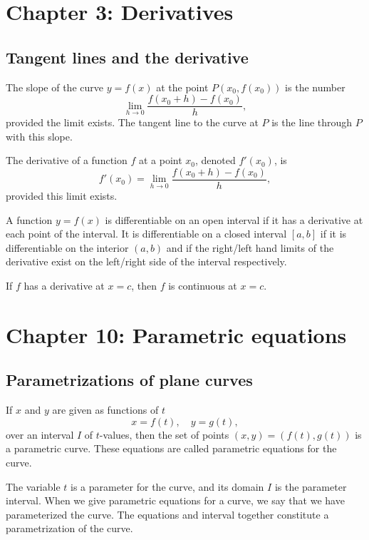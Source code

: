 \documentclass[oneside]{book}
\begin{document}
\section{Chapter 3: Derivatives}
\subsection{Tangent lines and the derivative}
\begin{definition}
	The slope of the curve \(y=f(x)\) at the point \(P(x_0,f(x_0))\) is the number
	\begin{equation*}
		\lim_{h\rightarrow 0}\frac{f(x_0+h)-f(x_0)}{h},
	\end{equation*}
	provided the limit exists. The tangent line to the curve at \(P\) is the line through \(P\) with this slope.
\end{definition}
\begin{definition}[Derivative]
	The derivative of a function \(f\) at a point \(x_0\), denoted \(f'(x_0)\), is
	\begin{equation*}
		f'(x_0)=\lim_{h\rightarrow 0}\frac{f(x_0+h)-f(x_0)}{h},
	\end{equation*}
	provided this limit exists.
\end{definition}
\begin{definition}[Differentiability]
	A function \(y=f(x)\) is differentiable on an open interval if it has a derivative at each point of the interval. It is differentiable on a closed interval \([a,b]\) if it is differentiable on the interior \((a,b)\) and if the right/left hand limits of the derivative exist on the left/right side of the interval respectively.
\end{definition}
\begin{theorem}
	If \(f\) has a derivative at \(x=c\), then \(f\) is continuous at \(x=c\).
\end{theorem}
\section{Chapter 10: Parametric equations}
\subsection{Parametrizations of plane curves}
\begin{definition}
	If \(x\) and \(y\) are given as functions of \(t\)
	\begin{equation*}
		x=f(t),\quad y=g(t),
	\end{equation*}
	over an interval \(I\) of \(t\)-values, then the set of points \((x,y)=(f(t),g(t))\) is a parametric curve. These equations are called parametric equations for the curve.
\end{definition}
\begin{remark}
	The variable \(t\) is a parameter for the curve, and its domain \(I\) is the parameter interval. When we give parametric equations for a curve, we say that we have parameterized the curve. The equations and interval together constitute a parametrization of the curve.
\end{remark}
\end{document}
